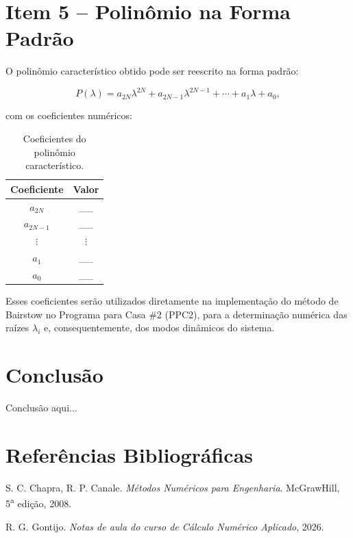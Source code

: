\documentclass[12pt,a4paper]{article}
\begin{document}
\section{Item 5 -- Polinômio na Forma Padrão}


O polinômio característico obtido pode ser reescrito na forma padrão:

\begin{equation}
    P(\lambda) = a_{2N}\lambda^{2N} + a_{2N-1}\lambda^{2N-1} + \cdots
    + a_1\lambda + a_0,
\end{equation}

\noindent com os coeficientes numéricos:

\begin{table}[H]
    \centering
    \caption{Coeficientes do polinômio característico.}
    \label{tab:coeficientes}
    \begin{tabular}{cc}
        \toprule
        Coeficiente & Valor \\
        \midrule
        $a_{2N}$ & \_\_ \\
        $a_{2N-1}$ & \_\_ \\
        $\vdots$ & $\vdots$ \\
        $a_1$ & \_\_ \\
        $a_0$ & \_\_ \\
        \bottomrule
    \end{tabular}
\end{table}

Esses coeficientes serão utilizados diretamente na implementação do método de
Bairstow no Programa para Casa \#2 (PPC2), para a determinação numérica das
raízes $\lambda_i$ e, consequentemente, dos modos dinâmicos do sistema.

\section{Conclusão}


Conclusão aqui...

\section*{Referências Bibliográficas}

\begin{enumerate}[label={[\arabic*]}]
    \item S. C. Chapra, R. P. Canale. \textit{Métodos Numéricos para Engenharia}.
    McGrawHill, 5\textsuperscript{a} edição, 2008.
    \item R. G. Gontijo. \textit{Notas de aula do curso de Cálculo Numérico
    Aplicado}, 2026.
\end{enumerate}
\end{document}
